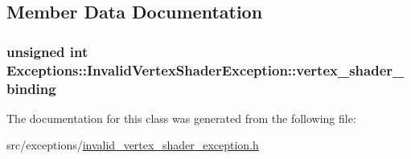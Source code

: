 \subsection{Member Data Documentation}
\hypertarget{class_exceptions_1_1_invalid_vertex_shader_exception_a4bf93e6765dc1611a442cedc749ecb43}{}
\subsubsection[{vertex\+\_\+shader\+\_\+binding}]{\setlength{\rightskip}{0pt plus 5cm}unsigned int Exceptions\+::\+Invalid\+Vertex\+Shader\+Exception\+::vertex\+\_\+shader\+\_\+binding\hspace{0.3cm}{\ttfamily [private]}}\label{class_exceptions_1_1_invalid_vertex_shader_exception_a4bf93e6765dc1611a442cedc749ecb43}


The documentation for this class was generated from the following file\+:\begin{DoxyCompactItemize}
\item 
src/exceptions/\hyperlink{invalid__vertex__shader__exception_8h}{invalid\+\_\+vertex\+\_\+shader\+\_\+exception.\+h}\end{DoxyCompactItemize}
